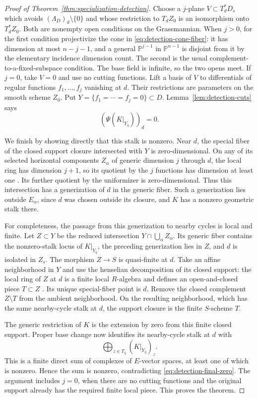 \begin{proof}[Proof of Theorem~\ref{thm:specialization-detection}]
Choose a $j$-plane $V\subset T_d^*D_s$ which avoids
$(\Lambda_D)_d\setminus\{0\}$ and whose restriction to $T_dZ_0$
is an isomorphism onto $T_d^*Z_0$.  Both are nonempty open conditions
on the Grassmannian.  When $j>0$, for the first condition projectivize the cone in
\eqref{eq:detection-cone-fiber}: it has dimension at most $n-j-1$,
and a general $\mathbb P^{j-1}$ in $\mathbb P^{n-1}$ is disjoint
from it by the elementary incidence dimension count.  The second is
the usual complement-to-a-fixed-subspace condition.  The base field
is infinite, so the two opens meet.  If $j=0$, take $V=0$ and use no
cutting functions.  Lift a basis of $V$ to
differentials of regular functions $f_1,\ldots,f_j$ vanishing at $d$.
Their restrictions are parameters on the smooth scheme $Z_0$.
Put $Y=\{f_1=\cdots=f_j=0\}\subset D$.
Lemma~\ref{lem:detection-cuts} says
\begin{equation}\label{eq:detection-final-zero}
                         (\Psi(K|_{Y_{\bar\eta}}))_d=0.
\end{equation}

We finish by showing directly that this stalk is nonzero.  Near $d$,
the special fiber of the closed support closure intersected with $Y$
is zero-dimensional.  On any of its selected horizontal components
$Z_\alpha$ of generic dimension $j$ through $d$, the local ring has
dimension $j+1$, so its quotient by the $j$ functions has dimension
at least one \cite[Tag 0B52]{Stacks}.  Its further quotient by the uniformizer is
zero-dimensional.  Thus this intersection has a generization of $d$
in the generic fiber.  Such a generization lies outside $E_\alpha$,
since $d$ was chosen outside its closure, and $K$ has a nonzero
geometric stalk there.

For completeness, the passage from this generization to nearby cycles
is local and finite.  Let $Z\subset Y$ be the reduced intersection
$Y\cap\bigcup_\alpha Z_\alpha$.  Its generic fiber contains the
nonzero-stalk locus of $K|_{Y_{\bar\eta}}$, the preceding generization
lies in $Z$, and $d$ is isolated in $Z_s$.
The morphism $Z\to S$ is quasi-finite at $d$.
Take an affine neighborhood in $Y$ and use the henselian decomposition
of its closed support: the local ring of $Z$ at $d$ is a finite local
$R$-algebra and defines an open-and-closed piece $T\subset Z$
\cite[Tag 04GH(3) and its proof]{Stacks}.  Its unique special-fiber
point is $d$.  Remove the closed complement $Z\setminus T$ from the
ambient neighborhood.  On the resulting neighborhood, which has the
same nearby-cycle stalk at $d$, the support closure is the finite
$S$-scheme $T$.

The generic restriction of $K$ is the extension by zero from this
finite closed support.  Proper base change now identifies its
nearby-cycle stalk at $d$ with
\[
               \bigoplus_{z\in T_{\bar\eta}}
                             (K|_{Y_{\bar\eta}})_z.
\]
This is a finite direct sum of complexes of $E$-vector spaces, at
least one of which is nonzero.  Hence the sum is nonzero, contradicting
\eqref{eq:detection-final-zero}.  The argument includes $j=0$, when
there are no cutting functions and the original support already has
the required finite local piece.  This proves the theorem.
\end{proof}
